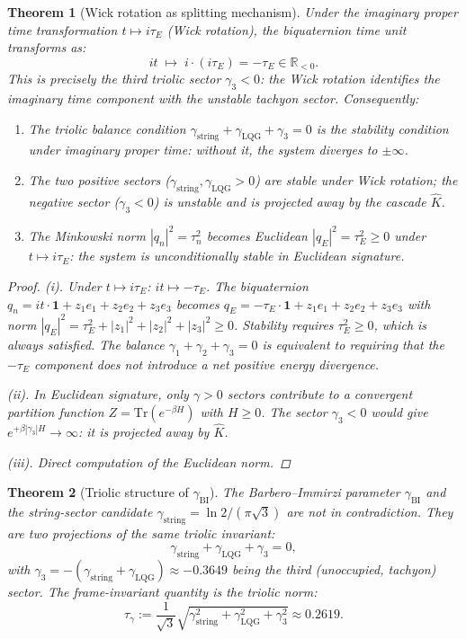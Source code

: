 \documentclass[12pt,a4paper]{article}
\newtheorem{theorem}{Theorem}[section]
\newcommand{\gstring}{\gamma_{\mathrm{string}}}
\newcommand{\gBI}{\gamma_{\mathrm{BI}}}
\newcommand{\KC}{\hat{K}}
\begin{document}
\begin{theorem}[Wick rotation as splitting mechanism]\label{thm:wick}
Under the imaginary proper time transformation $t\mapsto i\tau_E$
(Wick rotation), the biquaternion time unit transforms as:
\[
  it \;\mapsto\; i\cdot(i\tau_E) = -\tau_E \in\mathbb{R}_{<0}.
\]
This is precisely the third triolic sector $\gamma_3<0$: the Wick
rotation identifies the imaginary time component with the unstable
tachyon sector.
Consequently:
\begin{enumerate}[label=(\roman*)]
  \item The triolic balance condition
        $\gstring+\gamma_{\mathrm{LQG}}+\gamma_3=0$ is the stability
        condition under imaginary proper time: without it, the system
        diverges to $\pm\infty$.
  \item The two positive sectors ($\gstring,\gamma_{\mathrm{LQG}}>0$)
        are stable under Wick rotation; the negative sector
        ($\gamma_3<0$) is unstable and is projected away by the
        cascade $\KC$.
  \item The Minkowski norm $|q_n|^2=\tau_n^2$ becomes Euclidean
        $|q_E|^2=\tau_E^2\geq 0$ under $t\mapsto i\tau_E$: the system
        is unconditionally stable in Euclidean signature.
\end{enumerate}
\begin{proof}
(i). Under $t\mapsto i\tau_E$: $it\mapsto -\tau_E$.
The biquaternion $q_n=it\cdot\mathbf{1}+z_1 e_1+z_2 e_2+z_3 e_3$ becomes
$q_E=-\tau_E\cdot\mathbf{1}+z_1 e_1+z_2 e_2+z_3 e_3$
with norm $|q_E|^2=\tau_E^2+|z_1|^2+|z_2|^2+|z_3|^2\geq 0$.
Stability requires $\tau_E^2\geq 0$, which is always satisfied.
The balance $\gamma_1+\gamma_2+\gamma_3=0$ is equivalent to requiring
that the $-\tau_E$ component does not introduce a net positive energy
divergence.

(ii). In Euclidean signature, only $\gamma>0$ sectors contribute to a
convergent partition function $Z=\mathrm{Tr}(e^{-\beta H})$ with $H\geq 0$.
The sector $\gamma_3<0$ would give $e^{+\beta|\gamma_3|H}\to\infty$:
it is projected away by $\KC$.

(iii). Direct computation of the Euclidean norm.
\end{proof}
\end{theorem}

\begin{theorem}[Triolic structure of $\gBI$]
The Barbero--Immirzi parameter $\gBI$ and the string-sector candidate
$\gstring = \ln 2/(\pi\sqrt{3})$ are not in contradiction.
They are two projections of the same triolic invariant:
\[
  \gstring + \gamma_{\mathrm{LQG}} + \gamma_3 = 0,
\]
with $\gamma_3 = -(\gstring+\gamma_{\mathrm{LQG}})\approx -0.3649$ being
the third (unoccupied, tachyon) sector.
The frame-invariant quantity is the triolic norm:
\[
  \tau_\gamma := \frac{1}{\sqrt{3}}
  \sqrt{\gstring^2+\gamma_{\mathrm{LQG}}^2+\gamma_3^2}\approx 0.2619.
\]
\end{theorem}
\end{document}
